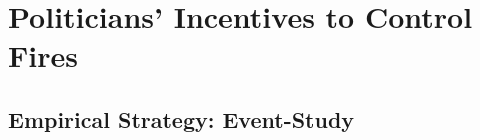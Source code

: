 \documentclass[12pt]{article}
\begin{document}

\section{Politicians' Incentives to Control Fires}
\subsection{Empirical Strategy: Event-Study}\label{ssec:empirical1_app}
\end{document}
